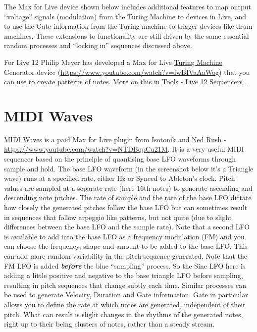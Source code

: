 \documentclass[
  12pt,
  letterpaper,
  oneside,
  open=any]{scrbook}
\makeatletter
\newcommand*\pandocbounded[1]{%
  \sbox\pandoc@box{#1}%
  \Gscale@div\@tempa{\textheight}{\dimexpr\ht\pandoc@box+\dp\pandoc@box\relax}%
  \Gscale@div\@tempb{\linewidth}{\wd\pandoc@box}%
  \ifdim\@tempb\p@<\@tempa\p@\let\@tempa\@tempb\fi%
  \ifdim\@tempa\p@<\p@\scalebox{\@tempa}{\usebox\pandoc@box}%
  \else\usebox{\pandoc@box}%
  \fi%
}
\makeatother
\begin{document}
The Max for Live device shown below includes additional features to map
output ``voltage'' signals (modulation) from the Turing Machine to
devices in Live, and to use the Gate information from the Turing machine
to trigger devices like drum machines. These extensions to functionality
are still driven by the same essential random processes and ``locking
in'' sequences discussed above.

\pandocbounded{\texttt{[image: images/Turing\_Machine.png]}}

For Live 12 Philip Meyer has developed a Max for Live
\href{https://isotonikstudios.com/product/turing-machine/?srsltid=AfmBOor_T0esjLa-jI_hMBqYTUuz_1TAYSXRbD5u_57BQk_dJ-Yr4ZTt}{Turing
Machine} Generator device
(\url{https://www.youtube.com/watch?v=fwBIVaAaWog}) that you can use to
create patterns of notes. More on this in
\hyperref[031-Tools-Live12_Sequencers]{Tools - Live 12 Sequencers} .

\section{MIDI Waves}\label{midi-waves}

\href{https://isotonikstudios.com/product/midi-waves-by-ned-rush/}{MIDI
Waves} is a paid Max for Live plugin from Isotonik and
\href{https://www.youtube.com/@NedRush}{Ned Rush} -
\url{https://www.youtube.com/watch?v=NTDBqpCu21M}. It is a very useful
MIDI sequencer based on the principle of quantising base LFO waveforms
through sample and hold. The base LFO waveform (in the screenshot below
it's a Triangle wave) runs at a specified rate, either Hz or Synced to
Ableton's clock. Pitch values are sampled at a separate rate (here 16th
notes) to generate ascending and descending note pitches. The rate of
sample and the rate of the base LFO dictate how closely the generated
pitches follow the base LFO but can sometimes result in sequences that
follow arpeggio like patterns, but not quite (due to slight differences
between the base LFO and the sample rate). Note that a second LFO is
available to add into the base LFO as a frequency modulation (FM) and
you can choose the frequency, shape and amount to be added to the base
LFO. This can add more random variability in the pitch sequence
generated. Note that the FM LFO is added \textbf{\emph{before}} the blue
``sampling'' process. So the Sine LFO here is adding a little positive
and negative to the base triangle LFO before sampling, resulting in
pitch sequences that change subtly each time. Similar processes can be
used to generate Velocity, Duration and Gate information. Gate in
particular allows you to define the rate at which notes are generated,
independent of their pitch. What can result is slight changes in the
rhythms of the generated notes, right up to their being clusters of
notes, rather than a steady stream.
\end{document}
